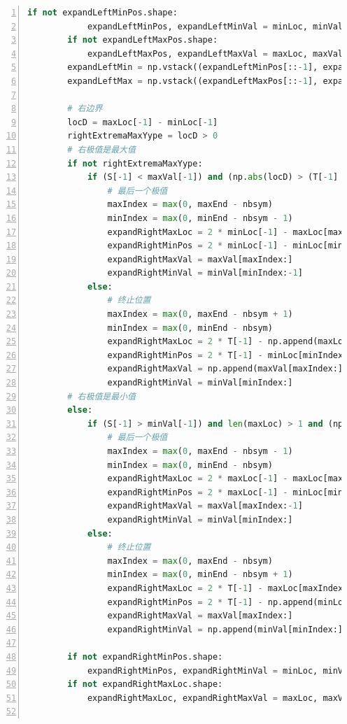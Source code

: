 \documentclass[cs4size,a4paper]{ctexart}
\numberwithin{equation}{section}
\numberwithin{table}{section}
\numberwithin{figure}{section}
\begin{document}
\begin{lstlisting}[language={python},
numbers=left,
numberstyle=\tiny\monaco,
basicstyle=\footnotesize\monaco]
        if not expandLeftMinPos.shape:
            expandLeftMinPos, expandLeftMinVal = minLoc, minVal
        if not expandLeftMaxPos.shape:
            expandLeftMaxPos, expandLeftMaxVal = maxLoc, maxVal
        expandLeftMin = np.vstack((expandLeftMinPos[::-1], expandLeftMinVal[::-1]))
        expandLeftMax = np.vstack((expandLeftMaxPos[::-1], expandLeftMaxVal[::-1]))

        # 右边界
        locD = maxLoc[-1] - minLoc[-1]
        rightExtremaMaxYype = locD > 0
        # 右极值是最大值
        if not rightExtremaMaxYype:
            if (S[-1] < maxVal[-1]) and (np.abs(locD) > (T[-1] - minLoc[-1])):
                # 最后一个极值
                maxIndex = max(0, maxEnd - nbsym)
                minIndex = max(0, minEnd - nbsym - 1)
                expandRightMaxLoc = 2 * minLoc[-1] - maxLoc[maxIndex:]
                expandRightMinPos = 2 * minLoc[-1] - minLoc[minIndex:-1]
                expandRightMaxVal = maxVal[maxIndex:]
                expandRightMinVal = minVal[minIndex:-1]
            else:
                # 终止位置
                maxIndex = max(0, maxEnd - nbsym + 1)
                minIndex = max(0, minEnd - nbsym)
                expandRightMaxLoc = 2 * T[-1] - np.append(maxLoc[maxIndex:], T[-1])
                expandRightMinPos = 2 * T[-1] - minLoc[minIndex:]
                expandRightMaxVal = np.append(maxVal[maxIndex:], S[-1])
                expandRightMinVal = minVal[minIndex:]
        # 右极值是最小值
        else:
            if (S[-1] > minVal[-1]) and len(maxLoc) > 1 and (np.abs(locD) > (T[-1] - maxLoc[-1])):
                # 最后一个极值
                maxIndex = max(0, maxEnd - nbsym - 1)
                minIndex = max(0, minEnd - nbsym)
                expandRightMaxLoc = 2 * maxLoc[-1] - maxLoc[maxIndex:-1]
                expandRightMinPos = 2 * maxLoc[-1] - minLoc[minIndex:]
                expandRightMaxVal = maxVal[maxIndex:-1]
                expandRightMinVal = minVal[minIndex:]
            else:
                # 终止位置
                maxIndex = max(0, maxEnd - nbsym)
                minIndex = max(0, minEnd - nbsym + 1)
                expandRightMaxLoc = 2 * T[-1] - maxLoc[maxIndex:]
                expandRightMinPos = 2 * T[-1] - np.append(minLoc[minIndex:], T[-1])
                expandRightMaxVal = maxVal[maxIndex:]
                expandRightMinVal = np.append(minVal[minIndex:], S[-1])

        if not expandRightMinPos.shape:
            expandRightMinPos, expandRightMinVal = minLoc, minVal
        if not expandRightMaxLoc.shape:
            expandRightMaxLoc, expandRightMaxVal = maxLoc, maxVal


\end{lstlisting}
\end{document}
